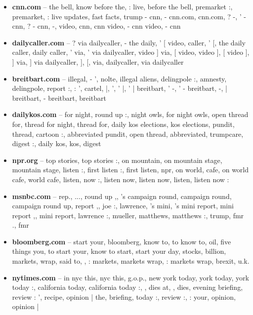 \documentclass{scrartcl}
\begin{document}
\begin{itemize}
\item \textbf{cnn.com} -- the bell, know before the, : live, before the bell, premarket :, premarket, : live updates, fast facts, trump - cnn, - cnn.com, cnn.com, ? -, ' - cnn, ? - cnn, -, video, cnn, cnn video, - cnn video, - cnn

\item \textbf{dailycaller.com} -- ? via dailycaller, - the daily, ' [ video, caller, ' [, the daily caller, daily caller, ' via, ' via dailycaller, video ] via, [ video, video ], [ video ], ] via, ] via dailycaller, ], [, via, dailycaller, via dailycaller

\item \textbf{breitbart.com} -- illegal, - ', nolte, illegal aliens, delingpole :, amnesty, delingpole, report :, : ', cartel, |, ', ' |, ' | breitbart, ' -, ' - breitbart, -, | breitbart, - breitbart, breitbart

\item \textbf{dailykos.com} -- for night, round up :, night owls, for night owls, open thread for, thread for night, thread for, daily kos elections, kos elections, pundit, thread, cartoon :, abbreviated pundit, open thread, abbreviated, trumpcare, digest :, daily kos, kos, digest

\item \textbf{npr.org} -- top stories, top stories :, on mountain, on mountain stage, mountain stage, listen :, first listen :, first listen, npr, on world, cafe, on world cafe, world cafe, listen, now :, listen now, listen now, listen, listen now :

\item \textbf{msnbc.com} -- rep., ..., round up ,, 's campaign round, campaign round, campaign round up, report ,, joe :, lawrence, 's mini, 's mini report, mini report ,, mini report, lawrence :, mueller, matthews, matthews :, trump, fmr ., fmr

\item \textbf{bloomberg.com} -- start your, bloomberg, know to, to know to, oil, five things you, to start your, know to start, start your day, stocks, billion, markets, wrap, said to,  , : markets, markets wrap, : markets wrap, brexit, u.k.

\item \textbf{nytimes.com} -- in nyc this, nyc this, g.o.p., new york today, york today, york today :, california today, california today :, , dies at, , dies, evening briefing, review : ', recipe, opinion | the, briefing, today :, review :, : your, opinion, opinion |


\end{itemize}
\end{document}
